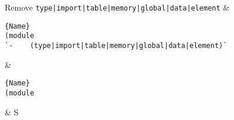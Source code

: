 Remove \texttt{type|import|table|memory|global|data|element}
&  
        \vspace{-4mm}\begin{lstlisting}[numbers=none]{Name}
(module 
`-    (type|import|table|memory|global|data|element)`
        \end{lstlisting}   
&  
        \vspace{-4mm}
\begin{lstlisting}[numbers=none]{Name}
(module 

        \end{lstlisting}   
&   S \\

\hline
